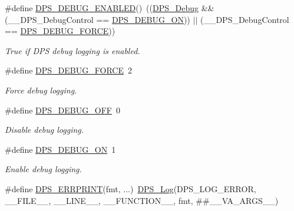 \begin{DoxyCompactItemize}
\#define \hyperlink{group__debug_gaeca5ec86966717c8dd2d1ffda4be2b3b}{D\+P\+S\+\_\+\+D\+E\+B\+U\+G\+\_\+\+E\+N\+A\+B\+L\+ED}()~((\hyperlink{group__debug_ga6f4bedbcc8b3bd12cea20b5ce3a8abba}{D\+P\+S\+\_\+\+Debug} \&\& (\+\_\+\+\_\+\+D\+P\+S\+\_\+\+Debug\+Control == \hyperlink{group__debug_ga777427dcd2750d5006024ce1a54daaac}{D\+P\+S\+\_\+\+D\+E\+B\+U\+G\+\_\+\+ON})) $\vert$$\vert$ (\+\_\+\+\_\+\+D\+P\+S\+\_\+\+Debug\+Control == \hyperlink{group__debug_ga6eb8eb8c3804ebd6f51fe2d7a7625ed8}{D\+P\+S\+\_\+\+D\+E\+B\+U\+G\+\_\+\+F\+O\+R\+CE}))
\begin{DoxyCompactList}\small\item\em True if D\+PS debug logging is enabled. \end{DoxyCompactList}\item 
\mbox{\label{group__debug_ga6eb8eb8c3804ebd6f51fe2d7a7625ed8}} 
\#define \hyperlink{group__debug_ga6eb8eb8c3804ebd6f51fe2d7a7625ed8}{D\+P\+S\+\_\+\+D\+E\+B\+U\+G\+\_\+\+F\+O\+R\+CE}~2
\begin{DoxyCompactList}\small\item\em Force debug logging. \end{DoxyCompactList}\item 
\mbox{\label{group__debug_ga39adc166f2ce05fb751212c1db9a6ce9}} 
\#define \hyperlink{group__debug_ga39adc166f2ce05fb751212c1db9a6ce9}{D\+P\+S\+\_\+\+D\+E\+B\+U\+G\+\_\+\+O\+FF}~0
\begin{DoxyCompactList}\small\item\em Disable debug logging. \end{DoxyCompactList}\item 
\mbox{\label{group__debug_ga777427dcd2750d5006024ce1a54daaac}} 
\#define \hyperlink{group__debug_ga777427dcd2750d5006024ce1a54daaac}{D\+P\+S\+\_\+\+D\+E\+B\+U\+G\+\_\+\+ON}~1
\begin{DoxyCompactList}\small\item\em Enable debug logging. \end{DoxyCompactList}\item 
\mbox{\label{group__debug_gac69225c4b8e73b27204a2963d4ca0633}} 
\#define \hyperlink{group__debug_gac69225c4b8e73b27204a2963d4ca0633}{D\+P\+S\+\_\+\+E\+R\+R\+P\+R\+I\+NT}(fmt, ...)~\hyperlink{group__debug_ga174fef61dca16376546e570c9b831502}{D\+P\+S\+\_\+\+Log}(D\+P\+S\+\_\+\+L\+O\+G\+\_\+\+E\+R\+R\+OR, \+\_\+\+\_\+\+F\+I\+L\+E\+\_\+\+\_\+, \+\_\+\+\_\+\+L\+I\+N\+E\+\_\+\+\_\+, \+\_\+\+\_\+\+F\+U\+N\+C\+T\+I\+O\+N\+\_\+\+\_\+, fmt, \#\#\+\_\+\+\_\+\+V\+A\+\_\+\+A\+R\+G\+S\+\_\+\+\_\+)
$$
\end{DoxyCompactItemize}
